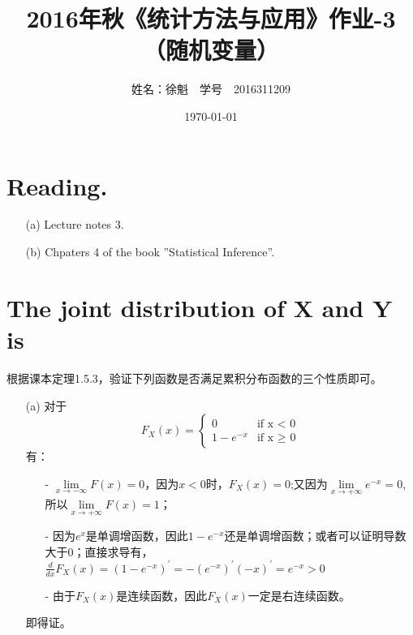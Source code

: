 \documentclass [12pt]{article}
\begin{document}
 \begin{CJK*}{GBK}{kai}
\newtheorem{theorem}{定理}
\newtheorem{definition}{定义}
\newtheorem{lemma}{引理}
\newtheorem{corollary}{推论}
\newtheorem{proposition}{性质}
\newtheorem{example}{例}
\newtheorem{remark}{注}
    \title{2016年秋《统计方法与应用》作业-3（随机变量）}
    \author{ 姓名：徐魁\,\,\,\, 学号~~{2016311209}}
    \date{\today}
\maketitle

\section{Reading. }
\begin{enumerate}
  \item[(a)] Lecture notes 3.
 \item[(b)] Chpaters 4 of the book ”Statistical Inference”.\\
 
\end{enumerate}

\section{The joint distribution of X and Y is}
根据课本定理1.5.3，验证下列函数是否满足累积分布函数的三个性质即可。
\begin{enumerate}
  \item[(a)]  对于
$$F_{X}(x)=
\begin{cases}
0& \text{if x < 0}\\
1- e^{-x} & \text{if x $\ge$ 0}
\end{cases}$$
有：
\begin{itemize}
\item[-] $\lim\limits_{x \to -\infty }F(x) = 0$，因为$x<0$时，$F_{X}(x)=0$;又因为$\lim\limits_{x \to +\infty }e^{-x} = 0$, 所以$\lim\limits_{x \to +\infty }F(x) = 1$；
\item[-] 因为$e^x$是单调增函数，因此$1 - e^{-x}$还是单调增函数；或者可以证明导数大于0；直接求导有，$\frac{d}{dx}F_{X}(x)=(1-e^{-x})^{'}=-(e^{-x})^{'}(-x)^{'}=e^{-x} >0$
\item[-] 由于$F_{X}(x)$是连续函数，因此$F_{X}(x)$一定是右连续函数。
\end{itemize}
即得证。\\


\end{enumerate}
\end{CJK*}
\end{document}
